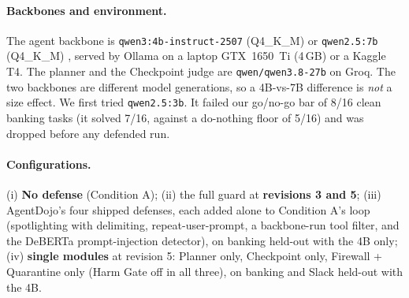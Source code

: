 \documentclass[11pt]{article}
\begin{document}
\paragraph{Backbones and environment.}
The agent backbone is \texttt{qwen3:4b-instruct-2507} (Q4\_K\_M) \citep{qwen2025qwen3} or \texttt{qwen2.5:7b} (Q4\_K\_M) \citep{qwen2024qwen25}, served by Ollama on a laptop GTX~1650~Ti (4\,GB) or a Kaggle T4. The planner and the Checkpoint judge are \texttt{qwen/qwen3.8-27b} on Groq. The two backbones are different model generations, so a 4B-vs-7B difference is \emph{not} a size effect. We first tried \texttt{qwen2.5:3b}. It failed our go/no-go bar of 8/16 clean banking tasks (it solved 7/16, against a do-nothing floor of 5/16) and was dropped before any defended run.

\begin{table}[t]
\centering\scriptsize
{}
\caption{Experimental configuration. Banking tasks 8 and 10 are always solved by an agent that does nothing.}
\label{tab:setup}
\end{table}

\paragraph{Configurations.}
(i) \textbf{No defense} (Condition A); (ii) the full guard at \textbf{revisions 3 and 5}; (iii) AgentDojo's four shipped defenses, each added alone to Condition A's loop (spotlighting with delimiting, repeat-user-prompt, a backbone-run tool filter, and the DeBERTa prompt-injection detector), on banking held-out with the 4B only; (iv) \textbf{single modules} at revision 5: Planner only, Checkpoint only, Firewall + Quarantine only (Harm Gate off in all three), on banking and Slack held-out with the 4B.
\end{document}
